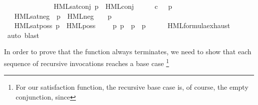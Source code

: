 \begin{isabellebody}
\ \ {\isacharparenleft}{\kern0pt}{\isacartoucheopen}{\isacharunderscore}{\kern0pt}\ {\isasymTurnstile}\ {\isacharunderscore}{\kern0pt}{\isacartoucheclose}\ {\isacharbrackleft}{\kern0pt}{}{}{\isacharcomma}{\kern0pt}\ {}{}{\isacharbrackright}{\kern0pt}\ {}{}{\isacharparenright}{\kern0pt}\isanewline
\ \ \isanewline
\ \ \ \ HML{\isacharunderscore}{\kern0pt}sat{\isacharunderscore}{\kern0pt}conj{\isacharcolon}{\kern0pt}\ {\isacartoucheopen}{\isacharparenleft}{\kern0pt}p\ {\isasymTurnstile}\ HML{\isacharunderscore}{\kern0pt}conj\ {\isasymPhi}{\isacharparenright}{\kern0pt}\ {\isacharequal}{\kern0pt}\ {\isacharparenleft}{\kern0pt}{\isasymforall}\ {\isasymphi}{\isachardot}{\kern0pt}\ {\isasymphi}\ {\isasymin}\isactrlsub c\ {\isasymPhi}\ {\isasymlongrightarrow}\ p\ {\isasymTurnstile}\ {\isasymphi}{\isacharparenright}{\kern0pt}{\isacartoucheclose}\ \isanewline
\ \ {\isacharbar}{\kern0pt}\ HML{\isacharunderscore}{\kern0pt}sat{\isacharunderscore}{\kern0pt}neg{\isacharcolon}{\kern0pt}\ \ {\isacartoucheopen}{\isacharparenleft}{\kern0pt}p\ {\isasymTurnstile}\ HML{\isacharunderscore}{\kern0pt}neg\ {\isasymphi}{\isacharparenright}{\kern0pt}\ {\isacharequal}{\kern0pt}\ {\isacharparenleft}{\kern0pt}{\isasymnot}\ p\ {\isasymTurnstile}\ {\isasymphi}{\isacharparenright}{\kern0pt}{\isacartoucheclose}\ \isanewline
\ \ {\isacharbar}{\kern0pt}\ HML{\isacharunderscore}{\kern0pt}sat{\isacharunderscore}{\kern0pt}poss{\isacharcolon}{\kern0pt}\ {\isacartoucheopen}{\isacharparenleft}{\kern0pt}p\ {\isasymTurnstile}\ HML{\isacharunderscore}{\kern0pt}poss\ {\isasymalpha}\ {\isasymphi}{\isacharparenright}{\kern0pt}\ {\isacharequal}{\kern0pt}\ {\isacharparenleft}{\kern0pt}{\isasymexists}\ p{\isacharprime}{\kern0pt}{\isachardot}{\kern0pt}\ p\ {\isasymlongmapsto}{\isasymalpha}\ p{\isacharprime}{\kern0pt}\ {\isasymand}\ p{\isacharprime}{\kern0pt}\ {\isasymTurnstile}\ {\isasymphi}{\isacharparenright}{\kern0pt}{\isacartoucheclose}\isanewline
%
\isadelimproof
\ \ %
\endisadelimproof
%
\isatagproof
{}\isamarkupfalse%
\ HML{\isacharunderscore}{\kern0pt}formula{\isachardot}{\kern0pt}exhaust\ \isamarkupfalse%
\ {\isacharparenleft}{\kern0pt}auto{\isacharcomma}{\kern0pt}\ blast{\isacharparenright}{\kern0pt}%
\endisatagproof
{\isafoldproof}%
%
\isadelimproof
%
\endisadelimproof
%
\begin{isamarkuptext}%
In order to prove that the function always terminates, we need to show that each sequence of recursive invocations reaches a base case%
\footnote{For our satisfaction function, the recursive base case is, of course, the empty conjunction, since
}
\end{isamarkuptext}
\end{isabellebody}
